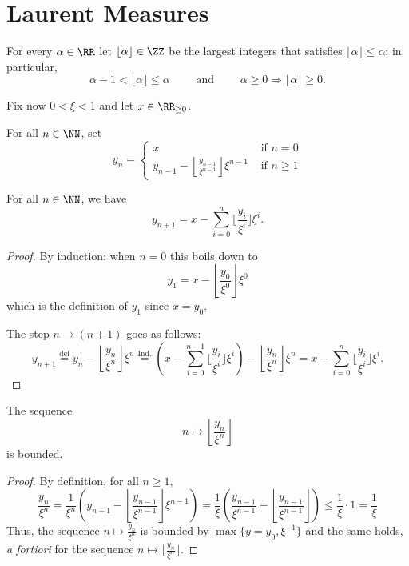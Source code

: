\section{Laurent Measures}
For every $\alpha\in\RR$ let $\lfloor \alpha\rfloor\in\ZZ$ be the largest integers that satisfies $\lfloor \alpha\rfloor\le \alpha$: in particular,
\[
\alpha-1< \lfloor \alpha\rfloor\le \alpha\qquad\text{ and }\qquad \alpha\geq 0 \Longrightarrow \lfloor \alpha\rfloor \geq 0.
\]

Fix now $0< \xi<1$ and let $x\in\RR_{\geq 0}$. 
\begin{definition}
For all $n\in\NN$, set
\[y_n=\begin{cases} x&\text{ if }n=0\\
    y_{n-1}-\left\lfloor \frac{y_{n-1}}{\xi^{n-1}}\right\rfloor\xi^{n-1}&\text{ if }n\ge 1
\end{cases}\]
\end{definition}
\begin{lemma}\label{lemma:finite_sum} For all $n\in\NN$, we have
\[
y_{n+1}=x-\sum_{i=0}^n\Big\lfloor\frac{y_i}{\xi^i}\Big\rfloor\xi^i.
\]
\end{lemma}
\begin{proof}
By induction: when $n=0$ this boils down to
\[
y_1=x-\left\lfloor \frac{y_0}{\xi^0}\right\rfloor \xi^0
\]
which is the definition of $y_1$ since $x=y_0$.

The step $n\to (n+1)$ goes as follows:
\[
y_{n+1}\overset{\text{def}}{=}y_{n}-\left\lfloor\frac{y_{n}}{\xi^{n}}\right\rfloor\xi^{n}\overset{\text{Ind.}}{=}\left(x-\sum_{i=0}^{n-1}\Big\lfloor\frac{y_i}{\xi^i}\Big\rfloor\xi^i\right)-\left\lfloor\frac{y_{n}}{\xi^{n}}\right\rfloor\xi^{n}=x-\sum_{i=0}^n\Big\lfloor\frac{y_i}{\xi^i}\Big\rfloor\xi^i.
\]\qedhere
\end{proof}
\begin{lemma}\label{lemma:bounded} The sequence
\[
n\mapsto \left\lfloor\frac{y_n}{\xi^n}\right\rfloor
\]
is bounded.
\end{lemma}
\begin{proof} By definition, for all $n\geq 1$,
\[
\frac{y_n}{\xi^n}=\frac{1}{\xi^n}\left(y_{n-1}-\left\lfloor\frac{y_{n-1}}{\xi^{n-1}}\right\rfloor\xi^{n-1}\right)=\frac{1}{\xi}\left(\frac{y_{n-1}}{\xi^{n-1}}-\left\lfloor\frac{y_{n-1}}{\xi^{n-1}}\right\rfloor\right)\le \frac{1}{\xi}\cdot 1= \frac{1}{\xi}
\]
Thus, the sequence $n\mapsto \frac{y_n}{\xi^n}$ is bounded by $\max\{y=y_0,\xi^{-1}\}$ and the same holds, \emph{a fortiori} for the sequence $n\mapsto \lfloor\frac{y_n}{\xi^n}\rfloor$. 
\end{proof}
